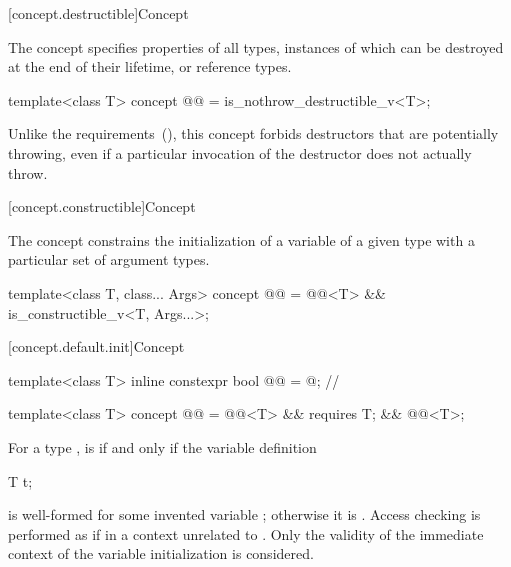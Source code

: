 [concept.destructible]{Concept }

\pnum
The  concept specifies properties of all types,
instances of which can be destroyed at the end of their lifetime, or reference
types.

\begin{itemdecl}
template<class T>
  concept @@ = is_nothrow_destructible_v<T>;
\end{itemdecl}

\begin{itemdescr}
\pnum
\begin{note}
Unlike the  requirements~(), this
concept forbids destructors that are potentially throwing, even if a particular
invocation of the destructor does not actually throw.
\end{note}
\end{itemdescr}

[concept.constructible]{Concept }

\pnum
The  concept constrains the initialization of a
variable of a given type with a particular set of argument types.

\begin{itemdecl}
template<class T, class... Args>
  concept @@ = @@<T> && is_constructible_v<T, Args...>;
\end{itemdecl}

[concept.default.init]{Concept }

\begin{itemdecl}
template<class T>
  inline constexpr bool @@ = @\seebelow@;  // \expos

template<class T>
  concept @@ = @@<T> &&
                                  requires { T{}; } &&
                                  @@<T>;
\end{itemdecl}

\begin{itemdescr}
\pnum
For a type ,  is 
if and only if the variable definition
\begin{codeblock}
T t;
\end{codeblock}
is well-formed for some invented variable ;
otherwise it is .
Access checking is performed as if in a context unrelated to .
Only the validity of the immediate context of the variable initialization is considered.
\end{itemdescr}

